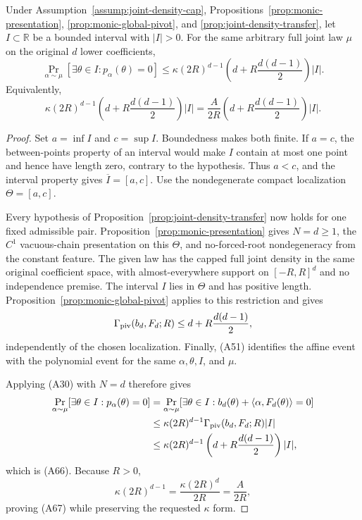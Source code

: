 \begin{proposition}
\label{prop:monic-positive-interval}
Under Assumption~\ref{assump:joint-density-cap},
Propositions~\ref{prop:monic-presentation}, \ref{prop:monic-global-pivot},
and \ref{prop:joint-density-transfer}, let $I\subset\mathbb R$ be a bounded
interval with $|I|>0$.  For the same arbitrary full joint law $\mu$ on the
original $d$ lower coefficients,
\[
\Pr_{\alpha\sim\mu}\!\left[\exists\theta\in I:p_\alpha(\theta)=0\right]
\leq\kappa(2R)^{d-1}
\left(d+R\frac{d(d-1)}2\right)|I|.
\tag{A66}
\]
Equivalently,
\[
\kappa(2R)^{d-1}
\left(d+R\frac{d(d-1)}2\right)|I|
=\frac A{2R}
\left(d+R\frac{d(d-1)}2\right)|I|.
\tag{A67}
\]
\end{proposition}

\begin{proof}
Set $a=\inf I$ and $c=\sup I$.  Boundedness makes both finite.  If $a=c$,
the between-points property of an interval would make $I$ contain at most
one point and hence have length zero, contrary to the hypothesis.  Thus
$a<c$, and the interval property gives $\overline I=[a,c]$.  Use the
nondegenerate compact localization $\Theta=[a,c]$.

Every hypothesis of Proposition~\ref{prop:joint-density-transfer} now holds
for one fixed admissible pair.  Proposition~\ref{prop:monic-presentation}
gives $N=d\geq1$, the $C^1$ vacuous-chain presentation on this $\Theta$,
and no-forced-root nondegeneracy from the constant feature.  The given law
has the capped full joint density in the same original coefficient space,
with almost-everywhere support on $[-R,R]^d$ and no independence premise.
The interval $I$ lies in $\Theta$ and has positive length.
Proposition~\ref{prop:monic-global-pivot} applies to this restriction and
gives
\[
\Gamma_{\rm piv}(b_d,F_d;R)
\leq d+R\frac{d(d-1)}2,
\]
independently of the chosen localization.  Finally, \textup{(A51)}
identifies the affine event with the polynomial event for the same
$\alpha,\theta,I$, and $\mu$.

Applying \textup{(A30)} with $N=d$ therefore gives
\[
\begin{aligned}
\Pr_{\alpha\sim\mu}[\exists\theta\in I:p_\alpha(\theta)=0]
&=\Pr_{\alpha\sim\mu}[\exists\theta\in I:
 b_d(\theta)+\langle\alpha,F_d(\theta)\rangle=0]\\
&\leq\kappa(2R)^{d-1}
 \Gamma_{\rm piv}(b_d,F_d;R)|I|\\
&\leq\kappa(2R)^{d-1}
 \left(d+R\frac{d(d-1)}2\right)|I|,
\end{aligned}
\]
which is \textup{(A66)}.  Because $R>0$,
\[
\kappa(2R)^{d-1}
=\frac{\kappa(2R)^d}{2R}=\frac A{2R},
\]
proving \textup{(A67)} while preserving the requested $\kappa$ form.


\end{proof}

